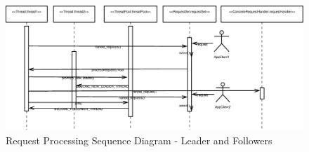 

\begin{figure}
	\centering
	\includegraphics*[width=1\textwidth, keepaspectratio=false]{fig/image18.eps}
	\caption{Request Processing Sequence Diagram - Leader and Followers}
	\label{fig:seq_diagram_lf_processing}
\end{figure}


